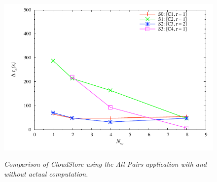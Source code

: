 \documentclass{rspublic}
\newcommand{\micnote}[1]{ {\textcolor{blue} { ***Michael: #1 }}}
\newcommand{\betynote}[1]{ {\textcolor{orange} { ***Bety: #1 }}}
\newcommand{\jhanote}[1]{} \newcommand{\micnote}[1]{}\newcommand{\betynote}[1]{} \newcommand{\fixme}[1]{}
\begin{document}
\begin{center}
\begin{figure}
{
\includegraphics[scale=0.5]{data/graphs/CloudStoreComputeMinusNoCompute144}
\label{Fig:experiment4:c}
}
\caption{\textit{Comparison of CloudStore using the All-Pairs
    application with and without actual computation.} \jhanote{the
    labels need to be fixed, i.e. remove long descriptions}}
\label{Fig:experiment4}
\end{figure}
\end{center}
\end{document}
